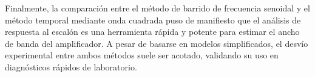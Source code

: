 Finalmente, la comparación entre el método de barrido de frecuencia senoidal y el método temporal mediante onda cuadrada puso de manifiesto
que el análisis de respuesta al escalón es una herramienta rápida y potente para estimar el ancho de banda del amplificador. A pesar
de basarse en modelos simplificados, el desvío experimental entre ambos métodos suele ser acotado, validando su
uso en diagnósticos rápidos de laboratorio.

